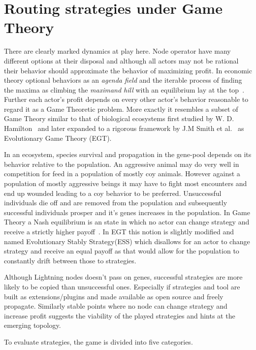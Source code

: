 \section{Routing strategies under Game Theory}

There are clearly marked dynamics at play here. Node operator have many different options at their disposal and although all actors may not be rational their behavior should approximate the behavior of maximizing profit. In economic theory optional behaviors as an \textit{agenda field} and the iterable process of finding the maxima as climbing the \textit{maximand hill} with an equilibrium lay at the top~\cite{boulding:evolutionary:economy}. Further each actor's profit depends on every other actor's behavior reasonable to regard it as a Game Theoretic problem. More exactly it resembles a subset of Game Theory similar to that of biological ecosystems first studied by W. D. Hamilton~\cite{hamilton:behavior} and later expanded to a rigorous framework by J.M Smith et al.~\cite{smith:price:logic:animal, smith:evolution:games} as Evolutionary Game Theory (EGT).

In an ecosystem, species survival and propagation in the gene-pool depends on its behavior relative to the population. An aggressive animal may do very well in competition for feed in a population of mostly coy animals. However against a population of mostly aggressive beings it may have to fight most encounters and end up wounded leading to a coy behavior to be preferred. Unsuccessful individuals die off and are removed from the population and subsequently successful individuals prosper and it's genes increases in the population. In Game Theory a Nash equilibrium is an state in which no actor can change strategy and receive a strictly higher payoff~\cite{nash:equilibrium}. In EGT this notion is slightly modified and named Evolutionary Stably Strategy(ESS) which disallows for an actor to change strategy and receive an equal payoff as that would allow for the population to constantly drift between those to strategies. 


Although Lightning nodes doesn't pass on genes, successful strategies are more likely to be copied than unsuccessful ones. Especially if strategies and tool are built as extensions/plugins and made available as open source and freely propagate. Similarly stable points where no node can change strategy and increase profit suggests the viability of the played strategies and hints at the emerging topology. 

To evaluate strategies, the game is divided into five categories.

